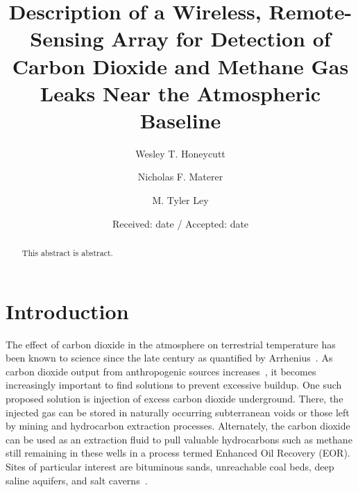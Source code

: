 \documentclass[numbook, envcountsect, envcountsame, envcountreset, runningheads, twocolumn]{svjour3}
\begin{document}
	\title{Description of a Wireless, Remote-Sensing Array for Detection of Carbon Dioxide and Methane Gas Leaks Near the Atmospheric Baseline}
	
	\author{Wesley T. Honeycutt \and
		Nicholas F. Materer \and
		M. Tyler Ley
	}
	

	\date{Received: date / Accepted: date}

	\maketitle
	
	\begin{abstract} 
		This abstract is abstract.
	\end{abstract}
	
	\section{Introduction}
	
		The effect of carbon dioxide in the atmosphere on terrestrial temperature has been known to science since the late  century as quantified by Arrhenius~\cite{arrhenius_xxxi._1896}.  As carbon dioxide output from anthropogenic sources increases~\cite{boden_global_2011}, it becomes increasingly important to find solutions to prevent excessive buildup.  One such proposed solution is injection of excess carbon dioxide underground.  There, the injected gas can be stored in naturally occurring subterranean voids or those left by mining and hydrocarbon extraction processes.  Alternately, the carbon dioxide can be used as an extraction fluid to pull valuable hydrocarbons such as methane still remaining in these wells in a process termed Enhanced Oil Recovery (EOR).  Sites of particular interest are bituminous sands, unreachable coal beds, deep saline aquifers, and salt caverns~\cite{bachu_sequestration_2000, white_separation_2003}.  
		
\end{document}
